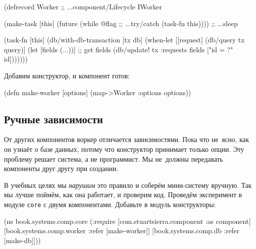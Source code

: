 \else

\begin{english}
  \begin{clojure}
(defrecord Worker
  ;; ...component/Lifecycle
  IWorker

  (make-task [this]
    (future
      (while @flag        ;; ...try/catch
        (task-fn this)))) ;; ...sleep

  (task-fn [this]
    (db/with-db-transaction [tx db]
      (when-let [[request] (db/query tx query)]
        (let [fields (...))] ;; get fields
          (db/update! tx :requests
                      fields ["id = ?" id]))))))
  \end{clojure}
\end{english}

\fi

\noindent
Добавим конструктор, и компонент готов:


\begin{english}
  \begin{clojure}
(defn make-worker
  [options]
  (map->Worker {:options options}))
  \end{clojure}
\end{english}

\subsection{Ручные зависимости}


От других компонентов воркер отличается зависимостями. Пока что не~ясно, как
он узнаёт о базе данных, потому что конструктор принимает только опции. Эту
проблему решает система, а не программист. Мы не~должны передавать компоненты
друг другу при создании.

В учебных целях мы \emph{нарушим} это правило и соберём мини-систему
вручную. Так мы лучше поймём, как она работает, и проверим код. Проведём
эксперимент в модуле \verb|core| с двумя компонентами. Добавьте в модуль
конструкторы:

\ifx\DEVICETYPE\MOBILE

\begin{english}
  \begin{clojure}
(ns book.systems.comp.core
  (:require
   [com.stuartsierra.component
    :as component]
   [book.systems.comp.worker
    :refer [make-worker]]
   [book.systems.comp.db
    :refer [make-db]]))
  \end{clojure}
\end{english}

